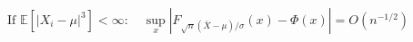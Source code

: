 \documentclass[preview]{standalone}
\begin{document}
\begin{align*}
\text{If } \mathbb{E}[|X_i-\mu|^3] < \infty: \quad \sup_x |F_{\sqrt{n}(\bar{X}-\mu)/\sigma}(x) - \Phi(x)| = O(n^{-1/2})
\end{align*}
\end{document}
